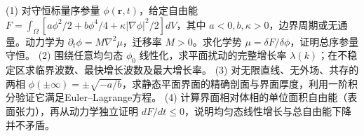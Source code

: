 (1) 对守恒标量序参量 \(\phi(\boldsymbol r,t)\)，给定自由能 \(F=\int_\Omega[a\phi^2/2+b\phi^4/4+\kappa|\nabla\phi|^2/2]dV\)，其中 \(a<0,b,\kappa>0\)，边界周期或无通量。动力学为 \(\partial_t\phi=M\nabla^2\mu\)，迁移率 \(M>0\)。求化学势 \(\mu=\delta F/\delta\phi\)，证明总序参量守恒。
(2) 围绕任意均匀态 \(\phi_0\) 线性化，求平面扰动的完整增长率 \(\lambda(k)\)；在不稳定区求临界波数、最快增长波数及最大增长率。
(3) 对无限直线、无外场、共存的两相 \(\phi(\pm\infty)=\pm\sqrt{-a/b}\)，求静态平面界面的精确剖面与界面厚度，利用一阶积分验证它满足Euler–Lagrange方程。
(4) 计算界面相对体相的单位面积自由能（表面张力），再从动力学独立证明 \(dF/dt\le0\)，说明均匀态线性增长与总自由能下降并不矛盾。
